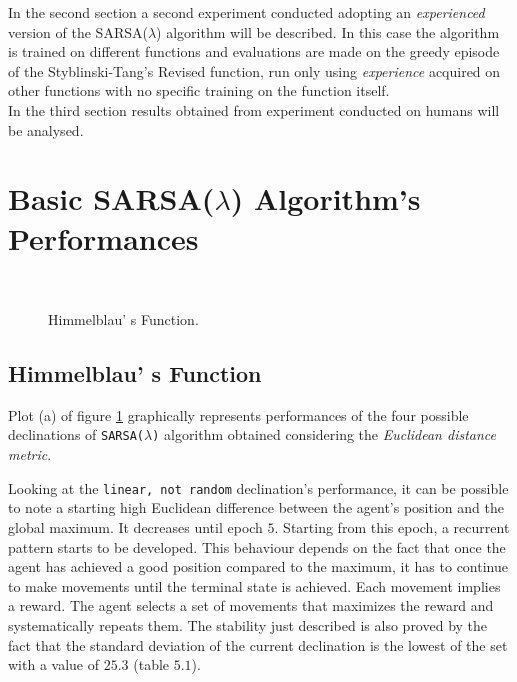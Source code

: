 In the second section a second experiment conducted adopting an \textit{experienced} version of the SARSA($\lambda$) algorithm will be described. In this case the algorithm is trained on different functions and evaluations are made on the greedy episode of the Styblinski-Tang's Revised function, run only using \textit{experience} acquired on other functions with no specific training on the function itself. \\

In the third section results obtained from experiment conducted on humans will be analysed.

\section{Basic SARSA($\lambda$) Algorithm's Performances}

\begin{figure}[h!]
	\begin{center}
		\\
	\end{center}
	\caption{
		Himmelblau' s Function.
	}
	\label{fig:HimmelblauResults}
\end{figure}

\subsection{Himmelblau' s Function} Plot (a) of figure \ref{fig:HimmelblauResults} graphically represents performances of the four possible declinations of {\tt SARSA($\lambda$)} algorithm obtained considering the \textit{Euclidean distance metric}. 

Looking at the {\tt linear, not random} declination's performance, it can be possible to note a starting high Euclidean difference between the agent's position and the global maximum. It decreases until epoch $5$. Starting from this epoch, a recurrent pattern starts to be developed. This behaviour depends on the fact that once the agent has achieved a good position compared to the maximum, it has to continue to make movements until the terminal state is achieved. Each movement implies a reward. The agent selects a set of movements that maximizes the reward and systematically repeats them. The stability just described is also proved by the fact that the standard deviation of the current declination is the lowest of the set with a value of $25.3$ (table $5.1$).

